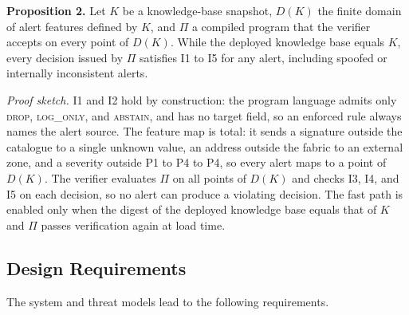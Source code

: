 \documentclass[final,5p]{elsarticle}
\begin{document}
\textbf{Proposition 2.}
Let $K$ be a knowledge-base snapshot, $D(K)$ the finite domain of alert features defined by $K$, and $\Pi$ a compiled program that the verifier accepts on every point of $D(K)$. While the deployed knowledge base equals $K$, every decision issued by $\Pi$ satisfies I1 to I5 for any alert, including spoofed or internally inconsistent alerts.

\textit{Proof sketch.}
I1 and I2 hold by construction: the program language admits only \textsc{drop}, \textsc{log\_only}, and \textsc{abstain}, and has no target field, so an enforced rule always names the alert source. The feature map is total: it sends a signature outside the catalogue to a single unknown value, an address outside the fabric to an external zone, and a severity outside P1 to P4 to P4, so every alert maps to a point of $D(K)$. The verifier evaluates $\Pi$ on all points of $D(K)$ and checks I3, I4, and I5 on each decision, so no alert can produce a violating decision. The fast path is enabled only when the digest of the deployed knowledge base equals that of $K$ and $\Pi$ passes verification again at load time.

\subsection{Design Requirements}
\label{sec:requirements}

The system and threat models lead to the following requirements.
\end{document}
